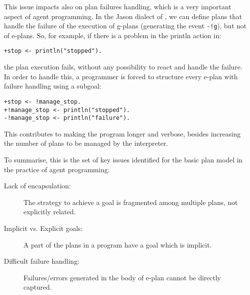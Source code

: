 This issue impacts also on plan failures handling, which is a very
important aspect of agent programming.
%
In the Jason dialect of {\asl}, we can define plans that handle the
failure of the execution of g-plans (generating the event
\texttt{-!g}), but not of e-plans.
%
So, for example, if there is a problem in the println action in:

\begin{small}
\begin{verbatim}
+stop <- println("stopped").
\end{verbatim}
\end{small}

\noindent the plan execution fails, without any possibility to react
and handle the failure.
%
In order to handle this, a programmer is forced to structure every
e-plan with failure handling using a subgoal:

\begin{small}
\begin{verbatim}
+stop <- !manage_stop.
+!manage_stop <- println("stopped").
-!manage_stop <- println("failure").
\end{verbatim}
\end{small}

\noindent This contributes to making the program longer and verbose,
besides increasing the number of plans to be managed by the
interpreter.


\bigskip

To summarise, this is the set of key issues identified for the basic
plan model in the practice of agent programming:
%
\begin{description}
%
\item[Lack of encapsulation:] The strategy to achieve a goal is
  fragmented among multiple plans, not explicitly related.
%
\item[Implicit vs. Explicit goals:] A part of the plans in a program
  have a goal which is implicit.
%
\item[Difficult failure handling:] Failures/errors generated in the
  body of e-plan cannot be directly captured.
%
\end{description}

%

